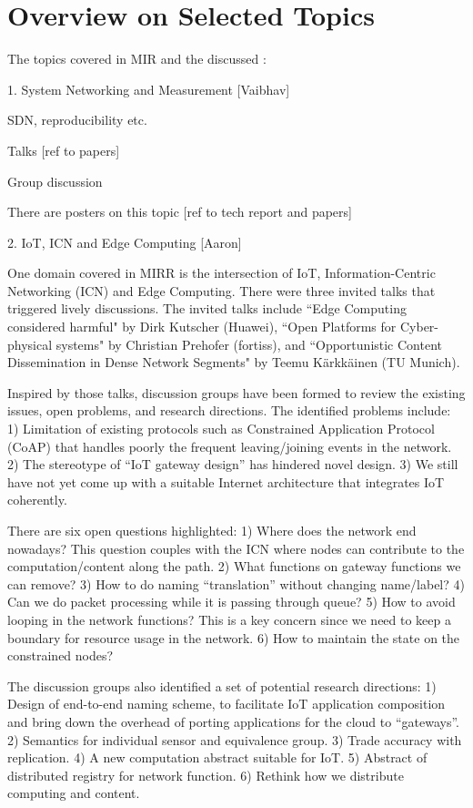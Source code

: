\section{Overview on Selected Topics} \label{sec:content}

The topics covered in MIR and the discussed : 

1. System Networking and Measurement [Vaibhav]

SDN, reproducibility etc.

Talks [ref to papers]

Group discussion

There are posters on this topic [ref to tech report and papers]


2. IoT, ICN and Edge Computing [Aaron]

One domain covered in MIRR is the intersection of IoT, Information-Centric
Networking (ICN) and Edge Computing. There were three invited talks that triggered
lively discussions. The invited talks include 
``Edge Computing considered harmful" by Dirk Kutscher (Huawei), 
``Open Platforms for Cyber-physical systems" by Christian Prehofer (fortiss),
and ``Opportunistic Content Dissemination in Dense Network Segments"
by Teemu Kärkkäinen (TU Munich). 

Inspired by those talks, discussion groups
have been formed to review the existing issues, open problems, and 
research directions. The identified problems include: 1) Limitation
of existing protocols such as Constrained Application Protocol (CoAP) that
handles poorly the frequent leaving/joining events in the network. 2) The
stereotype of ``IoT gateway design'' has hindered novel design. 3) We still
have not yet come up with a suitable Internet architecture that integrates
IoT coherently. 

There are six open questions highlighted: 1) Where does the network
end nowadays? This question couples
with the ICN where nodes can contribute to the computation/content along
the path. 2) What functions on gateway functions we can remove? 3) How to do
naming ``translation'' without changing name/label? 4) Can we do packet
processing while it is passing through queue? 5) How to avoid looping in
the network functions? This is a key concern since we need to keep a
boundary for resource usage in the network. 6) How to maintain the state on
the constrained nodes? 

The discussion groups also identified a set of potential
research directions: 1) Design of end-to-end naming scheme, to facilitate IoT
application composition and bring down the overhead of porting applications
for the cloud to ``gateways''. 2) Semantics for individual sensor and
equivalence group. 3) Trade accuracy with replication. 4) A new computation
abstract suitable for IoT. 5) Abstract of distributed registry for network
function. 6) Rethink how we distribute computing and content.


